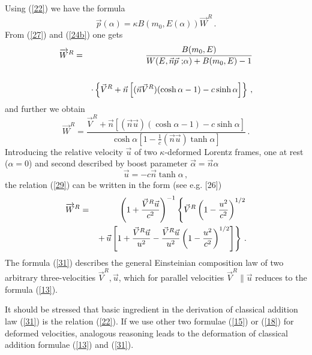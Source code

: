 \documentclass[a4paper,12pt]{article}
\begin{document}
Using (\ref{22}) we have the formula
\begin{equation}\label{27}
\vec{p}(\alpha) = \kappa B( m_0 ,E(\alpha)) \overrightarrow{W}^R\,
.
\end{equation}
From (\ref{27}) and (\ref{24b}) one gets
\begin{eqnarray}\label{28}
\overrightarrow{W}^R& =& \frac{B( m_0 , E)}{W(E , \vec{n}\vec{p}{\ ;}\alpha)+
B( m_0 , E) -1} \cr\cr &&\cdot \left\{ \vec{V}^R + \vec{n}\left[
(\vec{n}\vec{V}^R) (\cosh \alpha -1) - c \sinh \alpha \right]\right\}\, ,
\end{eqnarray}
and further we obtain
\begin{equation}\label{29}
  \overrightarrow{W}^R =
  \frac{\vec{V}^R + \vec{n}[(\vec{n}\vec{u})(\cosh \alpha -1) - c\sinh \alpha]}
  {\cosh \alpha [1 - \frac{1}{c}(\vec{n} \vec{u})
\tanh \alpha]}\, .
\end{equation}
Introducing the relative velocity $\vec{u}$ of two $\kappa$-deformed Lorentz
frames, one at rest ($\alpha = 0$) and second described by boost parameter
$\vec{\alpha} = \vec{n} \alpha$
\begin{equation}\label{30}
  \vec{u} = - c\vec{n} \tanh \alpha \, ,
\end{equation}
the relation (\ref{29}) can be written in the form (see e.g. [26])
\begin{eqnarray}\label{31}
  \overrightarrow{W}^R &= & \left( 1 +  \frac{\vec{V}^R
  \vec{u}}{c^2}\right)^{-1}
  \left\{ \vec{V}^R \left( 1 - \frac{u^2}{c^2}
  \right)^{1/2} \right.
  \cr
  &&
  \left.
  + \,  \vec{u} \left[  1 + \frac{\vec{V}^R
  \vec{u}}{u^2}  - \frac{\vec{V}^R
  \vec{u}}{u^2} \left( 1 - \frac{u^2}{c^2} \right)^{1/2}\right]
  \right\}\, .
\end{eqnarray}
The formula (\ref{31}) describes the general Einsteinian
composition law of two arbitrary three-velocities $\vec{V}^R,
\vec{u} $, which for parallel velocities $\vec{V}^R \| \vec{u} $
reduces to the formula (\ref{13}).

It should be stressed that basic ingredient in the derivation of
classical addition law (\ref{31}) is the relation (\ref{22}). If
we use other two formulae (\ref{15}) or (\ref{18}) for deformed
velocities, analogous reasoning leads to the deformation of
classical addition formulae (\ref{13}) and (\ref{31}).
\end{document}
